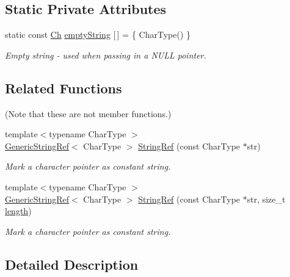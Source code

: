 \subsection*{Static Private Attributes}
\begin{DoxyCompactItemize}
\item 
static const \mbox{\hyperlink{structrapidjson_1_1_generic_string_ref_aa2a8eccae3d7eb14c30bc21afb7d6fba}{Ch}} \mbox{\hyperlink{structrapidjson_1_1_generic_string_ref_a0ad64af0076400ecb55fe707d469c460}{empty\+String}} \mbox{[}$\,$\mbox{]} = \{ Char\+Type() \}
\begin{DoxyCompactList}\small\item\em Empty string -\/ used when passing in a N\+U\+LL pointer. \end{DoxyCompactList}\end{DoxyCompactItemize}
\subsection*{Related Functions}
(Note that these are not member functions.) \begin{DoxyCompactItemize}
\item 
{\footnotesize template$<$typename Char\+Type $>$ }\\\mbox{\hyperlink{structrapidjson_1_1_generic_string_ref}{Generic\+String\+Ref}}$<$ Char\+Type $>$ \mbox{\hyperlink{structrapidjson_1_1_generic_string_ref_aa6b9fd9f6aa49405a574c362ba9af6b5}{String\+Ref}} (const Char\+Type $\ast$str)
\begin{DoxyCompactList}\small\item\em Mark a character pointer as constant string. \end{DoxyCompactList}\item 
{\footnotesize template$<$typename Char\+Type $>$ }\\\mbox{\hyperlink{structrapidjson_1_1_generic_string_ref}{Generic\+String\+Ref}}$<$ Char\+Type $>$ \mbox{\hyperlink{structrapidjson_1_1_generic_string_ref_a578c51ab574a50a9c760b9da7c7562f2}{String\+Ref}} (const Char\+Type $\ast$str, size\+\_\+t \mbox{\hyperlink{structrapidjson_1_1_generic_string_ref_ae223535ec20edf0c1db44a40b7735111}{length}})
\begin{DoxyCompactList}\small\item\em Mark a character pointer as constant string. \end{DoxyCompactList}\end{DoxyCompactItemize}


\subsection{Detailed Description}
